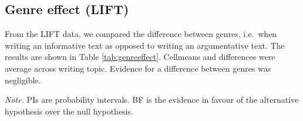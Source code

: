 \clearpage
\makeatletter
\efloat@restorefloats
\makeatother


\begin{appendix}
\section{}
\hypertarget{genre-effect-lift}{%
\subsection{Genre effect (LIFT)}\label{genre-effect-lift}}

From the LIFT data, we compared the difference between genres, i.e.~when
writing an informative text as opposed to writing an argumentative text.
The results are shown in Table \ref{tab:genreeffect}. Cellmeans and
differences were average across writing topic. Evidence for a difference
between genres was negligible.

\begin{center}
\begin{ThreePartTable}

\begin{TableNotes}[para]
\normalsize{\textit{Note.} PIs are probability intervals. BF is the evidence in favour of the alternative hypothesis over the null hypothesis.}
\end{TableNotes}

\footnotesize{

}
\end{ThreePartTable}
\end{center}
\end{appendix}
